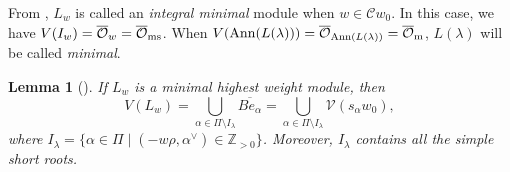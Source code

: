 \documentclass[11pt, reqno]{amsart}
\newcommand{\aff}{\mathbf{a}}
\renewcommand{\subset}{\subseteq}
\newcommand{\Ann}{\operatorname{Ann}}
\newtheorem{lem}[Thm]{Lemma}
\theoremstyle{definition}
\numberwithin{equation}{section}
\begin{document}



From \cite[Rem. 3.6]{BMXX}, $L_w$  is called an {\it integral  minimal} module when    $w\in \mathcal{C}w_0$. In this case, we have $ V(I_w)=\overline{\mathcal{O}}_w= \overline{\mathcal{O}}_{\rm ms}$. When  $ V(\Ann(L(\lambda)))=\overline{\mathcal{O}}_{\Ann(L(\lambda))}= \overline{\mathcal{O}}_{\rm m}$, $L(\lambda)$ will be called {\it minimal}.  

\begin{lem}[{\cite[Thm. 4.2]{BMXX}}]\label{minimal-integralequal}
 If $L_w$ is a minimal highest weight module, then
\[
V(L_w) = \bigcup_{\alpha \in \Pi \setminus I_\lambda} \overline{Be_\alpha}=\bigcup_{\alpha \in \Pi \setminus I_\lambda}\mathcal{V}(s_\alpha w_0),
\]
where $I_\lambda = \{ \alpha \in \Pi \mid ( -w\rho, \alpha^\vee ) \in \mathbb{Z}_{>0} \}$.   Moreover, $I_\lambda$ contains all the simple short roots.
\end{lem}



\end{document}

